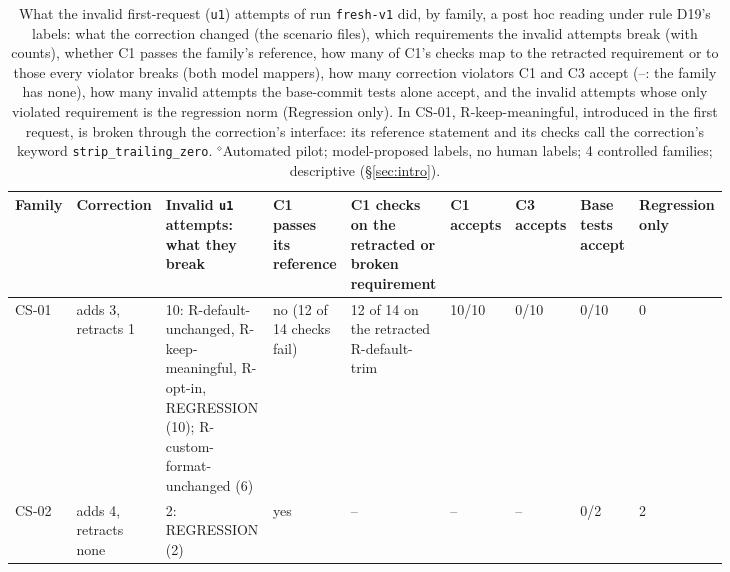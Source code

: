 \begin{table}[t]\centering\scriptsize\setlength{\tabcolsep}{2pt}
\caption{What the invalid first-request (\texttt{u1}) attempts of run \texttt{fresh-v1} did, by family, a post hoc reading under rule D19's labels: what the correction changed (the scenario files), which requirements the invalid attempts break (with counts), whether C1 passes the family's reference, how many of C1's checks map to the retracted requirement or to those every violator breaks (both model mappers), how many correction violators C1 and C3 accept (--: the family has none), how many invalid attempts the base-commit tests alone accept, and the invalid attempts whose only violated requirement is the regression norm (Regression only). In CS-01, R-keep-meaningful, introduced in the first request, is broken through the correction's interface: its reference statement and its checks call the correction's keyword \texttt{strip\_trailing\_zero}. $^{\diamond}$Automated pilot; model-proposed labels, no human labels; 4 controlled families; descriptive (\S\ref{sec:intro}).}\label{tab:fresh-behaviours}
\begin{tabular}{l>{\raggedright\arraybackslash}p{0.09\linewidth}>{\raggedright\arraybackslash}p{0.2\linewidth}>{\raggedright\arraybackslash}p{0.11\linewidth}>{\raggedright\arraybackslash}p{0.12\linewidth}>{\raggedright\arraybackslash}p{0.075\linewidth}>{\raggedright\arraybackslash}p{0.075\linewidth}>{\raggedright\arraybackslash}p{0.075\linewidth}>{\raggedright\arraybackslash}p{0.09\linewidth}}\toprule Family & Correction & Invalid \texttt{u1} attempts: what they break & C1 passes its reference & C1 checks on the retracted or broken requirement & C1 accepts & C3 accepts & Base tests accept & Regression only \\\midrule
CS-01 & \raggedright\hspace{0pt}adds 3, retracts 1 & \raggedright\hspace{0pt}10: R-default-unchanged, R-keep-meaningful, R-opt-in, REGRESSION (10); R-custom-format-unchanged (6) & \raggedright\hspace{0pt}no (12 of 14 checks fail) & \raggedright\hspace{0pt}12 of 14 on the retracted R-default-trim & \raggedright\hspace{0pt}10/10 & \raggedright\hspace{0pt}0/10 & \raggedright\hspace{0pt}0/10 & \raggedright\hspace{0pt}0 \tabularnewline
CS-02 & \raggedright\hspace{0pt}adds 4, retracts none & \raggedright\hspace{0pt}2: REGRESSION (2) & \raggedright\hspace{0pt}yes & \raggedright\hspace{0pt}-- & \raggedright\hspace{0pt}-- & \raggedright\hspace{0pt}-- & \raggedright\hspace{0pt}0/2 & \raggedright\hspace{0pt}2 \tabularnewline

\end{tabular}
\end{table}
